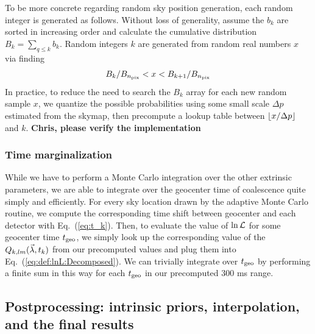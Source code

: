 To be more concrete regarding random sky position generation, each random integer is generated as follows. 
%
Without loss of generality, assume the $b_k$ are sorted in increasing order and calculate the cumulative distribution $B_k
= \sum_{q\le k} b_k$.   Random integers $k$ are generated from random real numbers $x$ via finding
\begin{eqnarray}
 B_k/B_{n_{\rm pix}} < x <  B_{k+1}/B_{n_{\rm pix}}
\end{eqnarray}
In practice, to reduce the need to search the $B_k$ array for each new random sample $x$, we quantize the possible probabilities
using some small scale $\Delta p$ estimated from the skymap, then  precompute a lookup table between $\floor*{x/\Delta
  p}$ and $k$.    \textbf{Chris, please verify the implementation}





\subsubsection{Time marginalization}
\label{sec:time_marg}

While we have to perform a Monte Carlo integration over the other extrinsic parameters, we are able to
integrate over the geocenter time of coalescence quite simply and efficiently.
For every sky location drawn by the adaptive Monte Carlo routine, we compute the
corresponding time shift between geocenter and each detector with Eq.~(\ref{eq:t_k}).
Then, to evaluate the value of $\ln {\cal L}$ for some geocenter time $t_{\rm geo}$,
we simply look up the corresponding value of the $Q_{k,lm}(\itrprm,t_k)$ from our precomputed values and plug them
into Eq.~(\ref{eq:def:lnL:Decomposed}).
We can trivially integrate over $t_{\rm geo}$ by performing a finite sum in this way 
for each $t_{\rm geo}$ in our precomputed $300$ ms range.





\subsection{Postprocessing: intrinsic priors, interpolation, and the final results}

